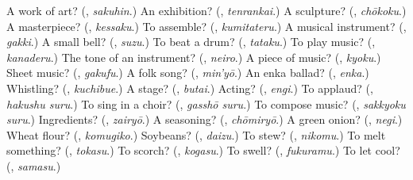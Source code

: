 \begin{tcolorbox}[breakable,colback=teal!4,colframe=teal!35!black,title={Before you move on}]
A work of art? (\textbf{}, \emph{sakuhin}.) An exhibition? (\textbf{}, \emph{tenrankai}.) A sculpture? (\textbf{}, \emph{chōkoku}.) A masterpiece? (\textbf{}, \emph{kessaku}.) To assemble? (\textbf{}, \emph{kumitateru}.) A musical instrument? (\textbf{}, \emph{gakki}.) A small bell? (\textbf{}, \emph{suzu}.) To beat a drum? (\textbf{}, \emph{tataku}.) To play music? (\textbf{}, \emph{kanaderu}.) The tone of an instrument? (\textbf{}, \emph{neiro}.) A piece of music? (\textbf{}, \emph{kyoku}.) Sheet music? (\textbf{}, \emph{gakufu}.) A folk song? (\textbf{}, \emph{min'yō}.) An enka ballad? (\textbf{}, \emph{enka}.) Whistling? (\textbf{}, \emph{kuchibue}.) A stage? (\textbf{}, \emph{butai}.) Acting? (\textbf{}, \emph{engi}.) To applaud? (\textbf{}, \emph{hakushu suru}.) To sing in a choir? (\textbf{}, \emph{gasshō suru}.) To compose music? (\textbf{}, \emph{sakkyoku suru}.) Ingredients? (\textbf{}, \emph{zairyō}.) A seasoning? (\textbf{}, \emph{chōmiryō}.) A green onion? (\textbf{}, \emph{negi}.) Wheat flour? (\textbf{}, \emph{komugiko}.) Soybeans? (\textbf{}, \emph{daizu}.) To stew? (\textbf{}, \emph{nikomu}.) To melt something? (\textbf{}, \emph{tokasu}.) To scorch? (\textbf{}, \emph{kogasu}.) To swell? (\textbf{}, \emph{fukuramu}.) To let cool? (\textbf{}, \emph{samasu}.)
\end{tcolorbox}
